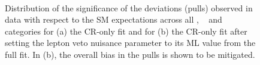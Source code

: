 \begin{figure}[!tbhp]
  \begin{center}
    ~
  \end{center}
  \caption{
  Distribution of the significance of the deviations (pulls) observed in data with respect
  to the SM expectations across all \njet, \nb~ and \scalht categories 
  for (a) the CR-only fit and for (b) the CR-only fit after setting 
  the lepton veto nuisance parameter to its ML value from the full fit. 
  In (b), the overall bias in the pulls is shown to be mitigated.}
\end{figure}

\begin{figure}[!tbhp]
  \begin{center}

\end{center}
\end{figure}
